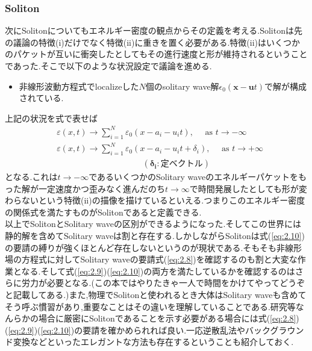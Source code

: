 \documentclass[dvipdfmx,11pt,a4paper,oneside,openany]{jsbook}
\begin{document}
\subsubsection{Soliton}
次にSolitonについてもエネルギー密度の観点からその定義を考える.Solitonは先の議論の特徴(i)だけでなく特徴(ii)に重きを置く必要がある.特徴(ii)はいくつかのパケットが互いに衝突したとしてもその進行速度と形が維持されるということであった.そこで以下のような状況設定で議論を進める.
\begin{itemize}
    \item 非線形波動方程式でlocalizeした$N$個のsolitary wave解$\epsilon_0(\bm{x}-\bm{u}t)$で解が構成されている.
\end{itemize}
上記の状況を式で表せば
\begin{align}
     & \varepsilon(x, t) \rightarrow \sum_{i=1}^{N} \varepsilon_{0}\left(x-a_{i}-u_{i} t\right), \quad \text { as } t \rightarrow-\infty\label{eq:2.9}             \\
     & \varepsilon(x, t) \rightarrow \sum_{i=1}^{N} \varepsilon_{0}\left(x-a_{i}-u_{i} t+\delta_{i}\right), \quad \text { as } t \rightarrow+\infty\label{eq:2.10} \\
     & \qquad \ \ \ \ \ \ \ \ \ \ \ \ \ \ \ \ \ \ \ \ \  \ \ \ \ \ \ \ \ \ \ \ \ \ \ \ \ (\bm{\delta_i}:\text{定ベクトル})\nonumber
\end{align}
となる.これは$t\rightarrow -\infty$であるいくつかのSolitary waveのエネルギーパケットをもった解が一定速度かつ歪みなく進んだのち$t\rightarrow \infty$で時間発展したとしても形が変わらないという特徴(ii)の描像を描けているといえる.つまりこのエネルギー密度の関係式を満たすものがSolitonであると定義できる.\\

以上でSolitonとSolitary waveの区別ができるようになった.そしてこの世界には静的解を含めてSolitary waveは割と存在する.しかしながらSolitonは式(\ref{eq:2.10})の要請の縛りが強くほとんど存在しないというのが現状である.そもそも非線形場の方程式に対してSolitary waveの要請式(\ref{eq:2.8})を確認するのも割と大変な作業となる.そして式(\ref{eq:2.9})(\ref{eq:2.10})の両方を満たしているかを確認するのはさらに労力が必要となる.(この本ではやりたきゃ一人で時間をかけてやってどうぞと記載してある.)また,物理でSolitonと使われるとき大体はSolitary waveも含めてそう呼ぶ慣習があり,重要なことはその違いを理解していることである.研究等なんらかの場合に厳密にSolitonであることを示す必要がある場合には式(\ref{eq:2.8})(\ref{eq:2.9})(\ref{eq:2.10})の要請を確かめられれば良い.一応逆散乱法やバックグラウンド変換などといったエレガントな方法も存在するということも紹介しておく.
\end{document}
